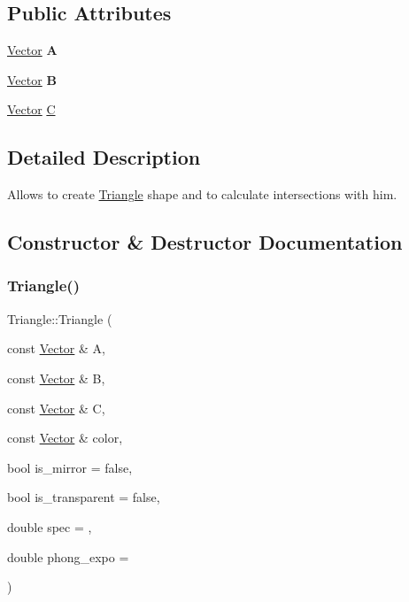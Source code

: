 \subsection*{Public Attributes}
\begin{DoxyCompactItemize}
\item 
\mbox{\label{classTriangle_a480301538f164dab4a842b5082397f1b}} 
\hyperlink{classVector}{Vector} {\bfseries A}
\item 
\mbox{\label{classTriangle_a149a806dd4a55259b987ece6ac3ae918}} 
\hyperlink{classVector}{Vector} {\bfseries B}
\item 
\hyperlink{classVector}{Vector} \hyperlink{classTriangle_af4a3aa7354bf229be9d4149dc800b5ee}{C}
\end{DoxyCompactItemize}


\subsection{Detailed Description}
Allows to create \hyperlink{classTriangle}{Triangle} shape and to calculate intersections with him. 

\subsection{Constructor \& Destructor Documentation}
\mbox{\label{classTriangle_a7646770e1ed718e4a88521d15113446c}} 
\subsubsection{\texorpdfstring{Triangle()}{Triangle()}}
{\footnotesize\ttfamily Triangle\+::\+Triangle (\begin{DoxyParamCaption}\item[{const \hyperlink{classVector}{Vector} \&}]{A,  }\item[{const \hyperlink{classVector}{Vector} \&}]{B,  }\item[{const \hyperlink{classVector}{Vector} \&}]{C,  }\item[{const \hyperlink{classVector}{Vector} \&}]{color,  }\item[{bool}]{is\+\_\+mirror = {\ttfamily false},  }\item[{bool}]{is\+\_\+transparent = {\ttfamily false},  }\item[{double}]{spec = {},  }\item[{double}]{phong\+\_\+expo = {} }\end{DoxyParamCaption})\hspace{0.3cm}{\ttfamily [inline]}}



